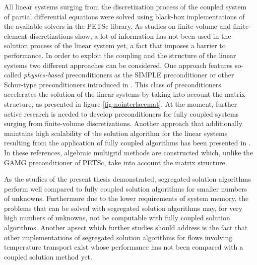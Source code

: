 All linear systems surging from the discretization process of the coupled system of partial differential equations were solved using black-box implementations of the available solvers in the PETSc library. As studies on finite-volume \cite{klaij13,darwish09,mangani14} and finite-element \cite{brown12,elman03,elman08,silvester01,turek02,mcinnes14} discretizations show, a lot of information has not been used in the solution process of the linear system yet, a fact that imposes a barrier to performance. In order to exploit the coupling and the structure of the linear systems two different approaches can be considered. One approach features so-called \emph{physics-based} preconditioners as the SIMPLE preconditioner or other Schur-type preconditioners introduced in \cite{klaij13,elman08}. This class of preconditioners accelerates the solution of the linear systems by taking into account the matrix structure, as presented in figure \ref{fig:nointerlacemat}. At the moment, further active research is needed to develop preconditioners for fully coupled systems surging from finite-volume discretizations. Another approach that additionally maintains high scalability of the solution algorithm for the linear systems resulting from the application of fully coupled algorithms has been presented in \cite{darwish09,mangani14}. In these references, algebraic multigrid methods are constructed which, unlike the GAMG preconditioner of PETSc, take into account the matrix structure.

As the studies of the present thesis demonstrated, segregated solution algorithms perform well compared to fully coupled solution algorithms for smaller numbers of unknowns. Furthermore due to the lower requirements of system memory, the problems that can be solved with segregated solution algorithms may, for very high numbers of unknowns, not be computable with fully coupled solution algorithms. Another apsect which further studies should address is the fact that other implementations of segregated solution algorithms for flows involving temperature transport exist \cite{liu84,oliveira01} whose performance has not been compared with a coupled solution method yet.

